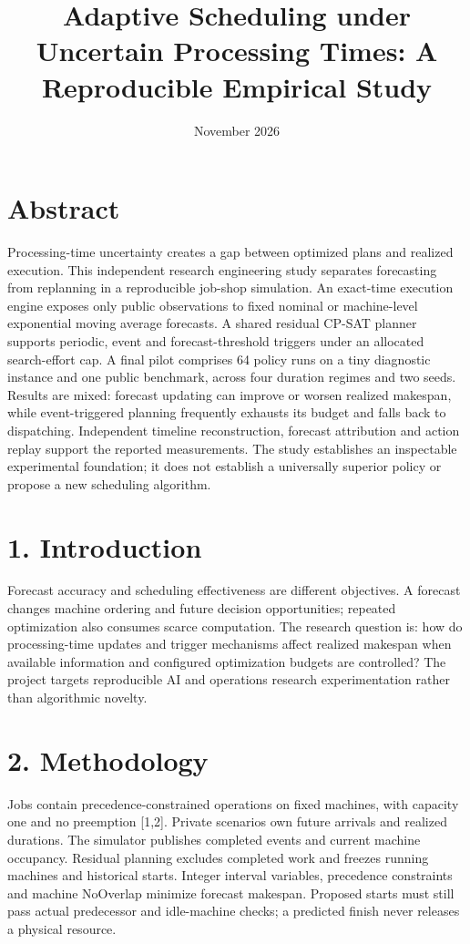 \documentclass[10pt,a4paper]{article}
\begin{document}
\title{Adaptive Scheduling under Uncertain Processing Times: A Reproducible Empirical Study}
\date{November 2026}
\maketitle
\section*{Abstract}
Processing-time uncertainty creates a gap between optimized plans and realized execution. This independent research engineering study separates forecasting from replanning in a reproducible job-shop simulation. An exact-time execution engine exposes only public observations to fixed nominal or machine-level exponential moving average forecasts. A shared residual CP-SAT planner supports periodic, event and forecast-threshold triggers under an allocated search-effort cap. A final pilot comprises 64 policy runs on a tiny diagnostic instance and one public benchmark, across four duration regimes and two seeds. Results are mixed: forecast updating can improve or worsen realized makespan, while event-triggered planning frequently exhausts its budget and falls back to dispatching. Independent timeline reconstruction, forecast attribution and action replay support the reported measurements. The study establishes an inspectable experimental foundation; it does not establish a universally superior policy or propose a new scheduling algorithm.

\section*{1. Introduction}
Forecast accuracy and scheduling effectiveness are different objectives. A forecast changes machine ordering and future decision opportunities; repeated optimization also consumes scarce computation. The research question is: how do processing-time updates and trigger mechanisms affect realized makespan when available information and configured optimization budgets are controlled? The project targets reproducible AI and operations research experimentation rather than algorithmic novelty.

\section*{2. Methodology}
Jobs contain precedence-constrained operations on fixed machines, with capacity one and no preemption [1,2]. Private scenarios own future arrivals and realized durations. The simulator publishes completed events and current machine occupancy. Residual planning excludes completed work and freezes running machines and historical starts. Integer interval variables, precedence constraints and machine NoOverlap minimize forecast makespan. Proposed starts must still pass actual predecessor and idle-machine checks; a predicted finish never releases a physical resource.
\end{document}
